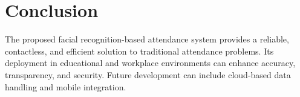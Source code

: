 \documentclass[12pt]{article}
\begin{document}
\section{Conclusion}
The proposed facial recognition-based attendance system provides a reliable, contactless, and efficient solution to traditional attendance problems. Its deployment in educational and workplace environments can enhance accuracy, transparency, and security. Future development can include cloud-based data handling and mobile integration.
\end{document}
